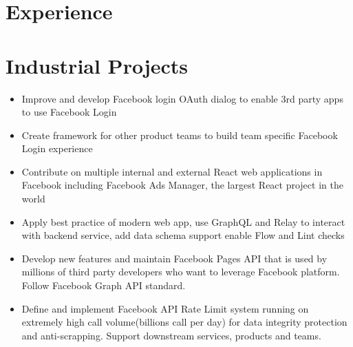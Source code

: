\documentclass{resume}
\begin{document}




\section{Experience}



\section{Industrial Projects}


\begin{itemize}
    \item Improve and develop Facebook login OAuth dialog to enable 3rd party apps to use Facebook Login
    \item Create framework for other product teams to build team specific Facebook Login experience
\end{itemize}


\begin{itemize}
    \item Contribute on multiple internal and external React web applications in Facebook including Facebook Ads Manager, the largest React project in the world
    \item Apply best practice of modern web app, use GraphQL and Relay to interact with backend service, add data schema support enable Flow and Lint checks
\end{itemize}



\begin{itemize}
    \item Develop new features and maintain Facebook Pages API that is used by millions of third party developers who want to leverage Facebook platform. Follow Facebook Graph API standard.
    \item Define and implement Facebook API Rate Limit system running on extremely high call volume(billions call per day) for data integrity protection and anti-scrapping. Support downstream services, products and teams.
\end{itemize}
\end{document}
